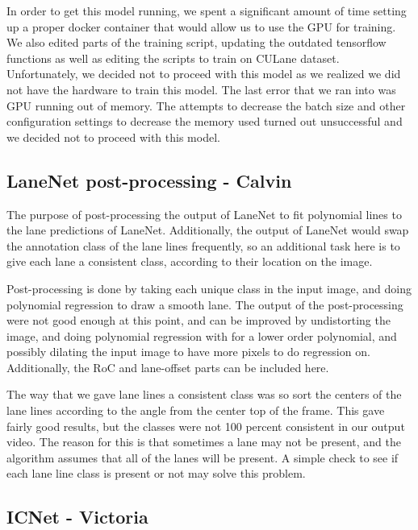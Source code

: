 \documentclass[twoside,twocolumn]{article}
\begin{document}
\par In order to get this model running, we spent a significant amount of time setting up a proper docker container that would allow us to use the GPU for training. We also edited parts of the training script, updating the outdated tensorflow functions as well as editing the scripts to train on CULane dataset. Unfortunately, we decided not to proceed with this model as we realized we did not have the hardware to train this model. The last error that we ran into was GPU running out of memory. The attempts to decrease the batch size and other configuration settings to decrease the memory used turned out unsuccessful and we decided not to proceed with this model.


\subsection{LaneNet post-processing - Calvin}
\par The purpose of post-processing the output of LaneNet to fit polynomial lines to the lane predictions of LaneNet. Additionally, the output of LaneNet would swap the annotation class of the lane lines frequently, so an additional task here is to give each lane a consistent class, according to their location on the image.
\par Post-processing is done by taking each unique class in the input image, and doing polynomial regression to draw a smooth lane. The output of the post-processing were not good enough at this point, and can be improved by undistorting the image, and doing polynomial regression with for a lower order polynomial, and possibly dilating the input image to have more pixels to do regression on. Additionally, the RoC and lane-offset parts can be included here.
\par The way that we gave lane lines a consistent class was so sort the centers of the lane lines according to the angle from the center top of the frame. This gave fairly good results, but the classes were not 100 percent consistent in our output video. The reason for this is that sometimes a lane may not be present, and the algorithm assumes that all of the lanes will be present. A simple check to see if each lane line class is present or not may solve this problem.



\subsection{ICNet - Victoria}
\end{document}
